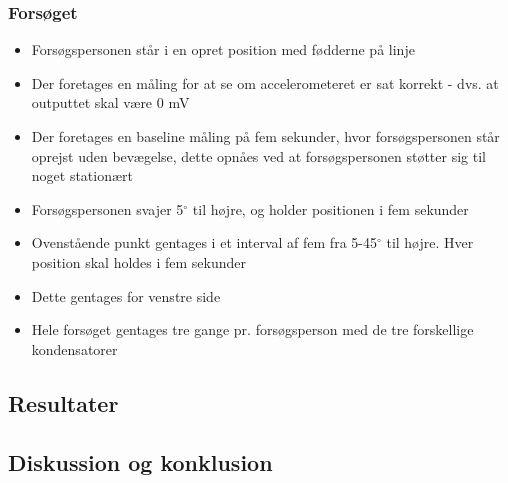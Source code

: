 \subsubsection{Forsøget}
\begin{itemize}
\item Forsøgspersonen står i en opret position med fødderne på linje
\item Der foretages en måling for at se om accelerometeret er sat korrekt - dvs. at outputtet skal være 0 mV
\item Der foretages en baseline måling på fem sekunder, hvor forsøgspersonen står oprejst uden bevægelse, dette opnåes ved at forsøgspersonen støtter sig til noget stationært
\item Forsøgspersonen svajer 5${^\circ}$ til højre, og holder positionen i fem sekunder
\item Ovenstående punkt gentages i et interval af fem fra 5-45${^\circ}$ til højre. Hver position skal holdes i fem sekunder
\item Dette gentages for venstre side
\item Hele forsøget gentages tre gange pr. forsøgsperson med de tre forskellige kondensatorer
\end{itemize}

\subsection{Resultater}

\subsection{Diskussion og konklusion}